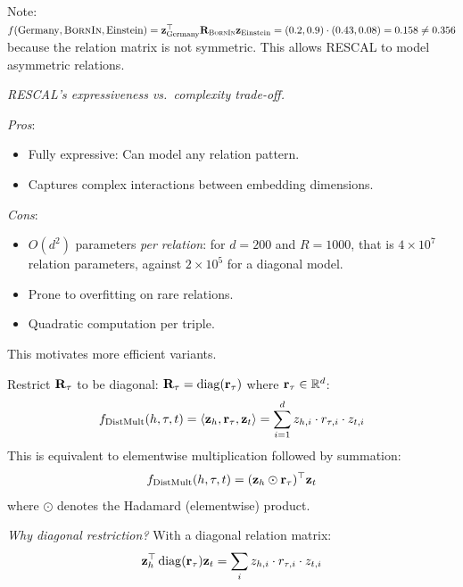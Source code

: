 \begin{notechapter}
\begin{example}
Note: $f(\text{Germany}, \textsc{BornIn}, \text{Einstein}) = \mathbf{z}_{\text{Germany}}^\top\mathbf{R}_{\textsc{BornIn}}\mathbf{z}_{\text{Einstein}} = (0.2, 0.9)\cdot(0.43, 0.08) = 0.158 \neq 0.356$ because the relation matrix is not symmetric. This allows RESCAL to model asymmetric relations.
\end{example}

\begin{keyidea}
\emph{RESCAL's expressiveness vs.\ complexity trade-off.}

\emph{Pros}:
\begin{itemize}
    \item Fully expressive: Can model any relation pattern.
    \item Captures complex interactions between embedding dimensions.
\end{itemize}

\emph{Cons}:
\begin{itemize}
    \item $O(d^2)$ parameters \emph{per relation}: for $d = 200$ and $R = 1000$, that is $4\times10^7$ relation parameters, against $2\times10^5$ for a diagonal model.
    \item Prone to overfitting on rare relations.
    \item Quadratic computation per triple.
\end{itemize}

This motivates more efficient variants.
\end{keyidea}

\begin{definition}
Restrict $\mathbf{R}_\tau$ to be diagonal: $\mathbf{R}_\tau = \operatorname{diag}(\mathbf{r}_\tau)$ where $\mathbf{r}_\tau \in \mathbb{R}^d$:
\begin{equation}
f_{\text{DistMult}}(h, \tau, t) = \langle \mathbf{z}_h, \mathbf{r}_\tau, \mathbf{z}_t \rangle = \sum_{i=1}^{d} z_{h,i} \cdot r_{\tau,i} \cdot z_{t,i}
\end{equation}
This is equivalent to elementwise multiplication followed by summation:
\[
f_{\text{DistMult}}(h, \tau, t) = (\mathbf{z}_h \odot \mathbf{r}_\tau)^\top \mathbf{z}_t
\]
where $\odot$ denotes the Hadamard (elementwise) product.
\end{definition}

\begin{intuition}
\emph{Why diagonal restriction?}
With a diagonal relation matrix:
\[
\mathbf{z}_h^\top \operatorname{diag}(\mathbf{r}_\tau) \mathbf{z}_t = \sum_i z_{h,i} \cdot r_{\tau,i} \cdot z_{t,i}
\]


\end{intuition}
\end{notechapter}
